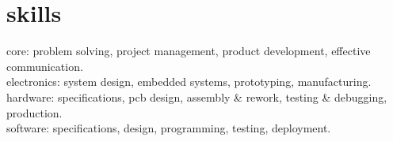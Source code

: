 
\section{skills}
  \vspace{-0.2cm}

{\headingfont core}: problem solving, project management, product development, effective communication.\\
{\headingfont electronics}: system design, embedded systems, prototyping, manufacturing.\\
{\headingfont hardware}: specifications, pcb design, assembly \& rework, testing \& debugging, production. \\
{\headingfont software}: specifications, design, programming, testing, deployment.